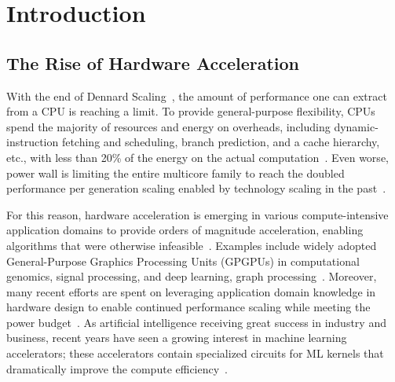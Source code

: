 \chapter{Introduction}

\section{The Rise of Hardware Acceleration}

With the end of Dennard Scaling~\cite{dennard}, the amount of performance one can extract from a CPU is reaching a limit.
To provide general-purpose flexibility, CPUs spend the majority of resources and energy on overheads, 
including dynamic-instruction fetching and scheduling, branch prediction, and a cache hierarchy, etc., 
with less than 20\% of 
the energy on the actual computation~\cite{mark}.
Even worse, power wall is limiting the entire multicore family
to reach the doubled performance per generation scaling enabled by technology scaling in the 
past~\cite{multicorescale}.

For this reason, hardware acceleration is emerging in various compute-intensive application domains 
to provide orders of magnitude acceleration, enabling algorithms that were otherwise
infeasible~\cite{genomicaccel, bioaccel, fpgadeeplearn, fpgacripto}.
Examples include widely adopted General-Purpose Graphics Processing Units (GPGPUs) 
in computational genomics, signal processing, and
deep learning, graph processing~\cite{genomicaccel, bioaccel, fpgacloudsurvey}.
Moreover, many recent efforts are spent on leveraging application domain knowledge in hardware design to enable 
continued performance scaling while meeting the power budget~\cite{turinglecture}.
As artificial intelligence receiving great success in industry and business,
recent years have seen a growing interest in machine learning accelerators;
these accelerators contain specialized circuits for ML kernels that dramatically improve the compute
efficiency~\cite{dadiannao,tpu,eie,chen2017eyeriss,tangram,truenorth}.

